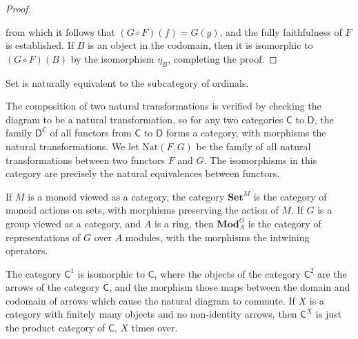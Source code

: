 \begin{proof}
    \begin{center}
    \end{center}
    from which it follows that $(G \circ F)(f) = G(g)$, and the fully faithfulness of $F$ is established. If $B$ is an object in the codomain, then it is isomorphic to $(G \circ F)(B)$ by the isomorphism $\eta_B$, completing the proof.
\end{proof}

\begin{example}
    {\sf Set} is naturally equivalent to the subcategory of ordinals.
\end{example}

The composition of two natural transformations is verified by checking the diagram to be a natural transformation, so for any two categories $\mathsf{C}$ to $\mathsf{D}$, the family $\mathsf{D}^{\mathsf{C}}$ of all functors from $\mathsf{C}$ to $\mathsf{D}$ forms a category, with morphisms the natural transformations. We let $\text{Nat}(F,G)$ be the family of all natural transformations between two functors $F$ and $G$. The isomorphisms in this category are precisely the natural equivalences between functors.

\begin{example}
    If $M$ is a monoid viewed as a category, the category $\textbf{Set}^M$ is the category of monoid actions on sets, with morphisms preserving the action of $M$. If $G$ is a group viewed as a category, and $A$ is a ring, then $\textbf{Mod}_A^G$ is the category of representations of $G$ over $A$ modules, with the morphisms the intwining operators.
\end{example}

\begin{example}
    The category $\mathsf{C}^1$ is isomorphic to $\mathsf{C}$, where the objects of the category $\mathsf{C}^2$ are the arrows of the category $\mathsf{C}$, and the morphism those maps between the domain and codomain of arrows which cause the natural diagram to commute. If $X$ is a category with finitely many objects and no non-identity arrows, then $\mathsf{C}^X$ is just the product category of $\mathsf{C}$, $X$ times over.
\end{example}

